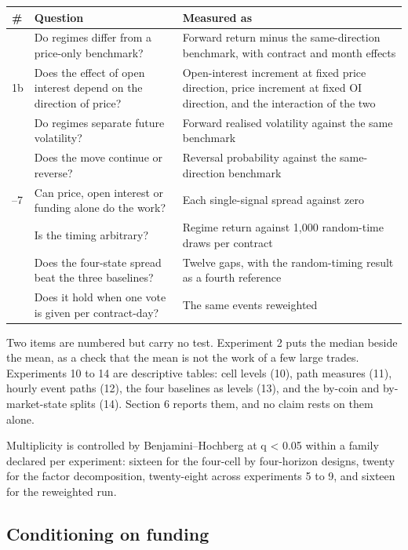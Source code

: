 \documentclass[11pt,a4paper]{article}
\begin{document}
\begin{table}[H]\centering
\footnotesize
\begin{tabularx}{\linewidth}{>{\raggedright\arraybackslash}X>{\raggedright\arraybackslash}X>{\raggedright\arraybackslash}X}
\toprule
\# & Question & Measured as \\
\midrule
1 & Do regimes differ from a price-only benchmark? & Forward return minus the same-direction benchmark, with contract and month effects \\
1b & Does the effect of open interest depend on the direction of price? & Open-interest increment at fixed price direction, price increment at fixed OI direction, and the interaction of the two \\
3 & Do regimes separate future volatility? & Forward realised volatility against the same benchmark \\
4 & Does the move continue or reverse? & Reversal probability against the same-direction benchmark \\
5--7 & Can price, open interest or funding alone do the work? & Each single-signal spread against zero \\
8 & Is the timing arbitrary? & Regime return against 1,000 random-time draws per contract \\
9 & Does the four-state spread beat the three baselines? & Twelve gaps, with the random-timing result as a fourth reference \\
15 & Does it hold when one vote is given per contract-day? & The same events reweighted \\
\bottomrule
\end{tabularx}
\end{table}

Two items are numbered but carry no test. Experiment 2 puts the median beside the mean, as a check that the mean is not the work of a few large trades. Experiments 10 to 14 are descriptive tables: cell levels (10), path measures (11), hourly event paths (12), the four baselines as levels (13), and the by-coin and by-market-state splits (14). Section 6 reports them, and no claim rests on them alone.

Multiplicity is controlled by Benjamini--Hochberg at q < 0.05 within a family declared per experiment: sixteen for the four-cell by four-horizon designs, twenty for the factor decomposition, twenty-eight across experiments 5 to 9, and sixteen for the reweighted run.

\subsection{Conditioning on funding}
\end{document}
